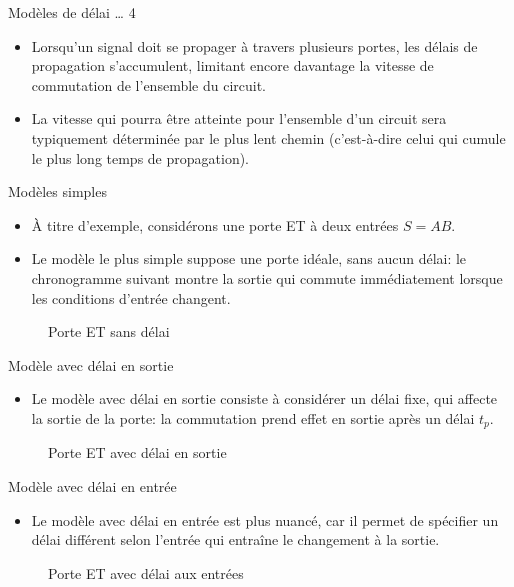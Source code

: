 \documentclass[presentation]{beamer}
\begin{document}
\begin{frame}[label={sec:org55a55a3}]{Modèles de délai \ldots{} 4}
\begin{itemize}
\item Lorsqu'un signal doit se propager à travers plusieurs portes, les délais de propagation s'accumulent, limitant encore davantage la vitesse de commutation de l'ensemble du circuit.

\item La vitesse qui pourra être atteinte pour l'ensemble d'un circuit sera typiquement déterminée par le plus lent chemin (c'est-à-dire celui qui cumule le plus long temps de propagation).
\end{itemize}
\end{frame}

\begin{frame}[label={sec:org14ff7fb}]{Modèles simples}
\begin{itemize}
\item À titre d'exemple, considérons une porte ET à deux entrées \(S = A B\).

\item Le modèle le plus simple suppose une porte idéale, sans aucun délai: le chronogramme suivant montre la sortie qui commute immédiatement lorsque les conditions d'entrée changent.
\end{itemize}

\begin{figure}[htbp]
\centering

\caption{\label{fig:orge79a907}Porte ET sans délai}
\end{figure}
\end{frame}

\begin{frame}[label={sec:org26e29b4}]{Modèle avec délai en sortie}
\begin{itemize}
\item Le modèle avec délai en sortie consiste à considérer un délai fixe, qui affecte la sortie de la porte: la commutation prend effet en sortie après un délai \(t_p\).
\end{itemize}


\begin{figure}[htbp]
\centering

\caption{\label{fig:org23533ad}Porte ET avec délai en sortie}
\end{figure}
\end{frame}

\begin{frame}[label={sec:org2e0e8bc}]{Modèle avec délai en entrée}
\begin{itemize}
\item Le modèle avec délai en entrée est plus nuancé, car il permet de spécifier un délai différent selon l'entrée qui entraîne le changement à la sortie.
\end{itemize}

\begin{figure}[htbp]
\centering

\caption{\label{fig:orgfcbb184}Porte ET avec délai aux entrées}
\end{figure}
\end{frame}
\end{document}
